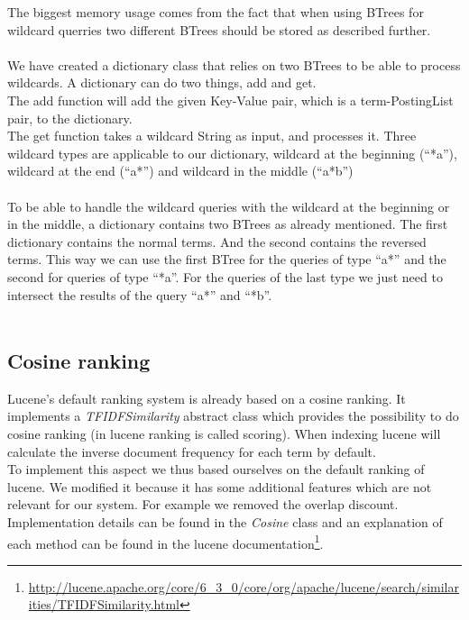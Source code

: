 \documentclass{article}
\begin{document}
The biggest memory usage comes from the fact that when  using BTrees for wildcard querries two different BTrees should be stored as described further.\\\\
We have created a dictionary class that relies on two BTrees to be able to process wildcards. A dictionary can do two things, add and get.\\
The add function will add the given Key-Value pair, which is a term-PostingList pair, to the dictionary.\\
The get function takes a wildcard String as input, and processes it. Three wildcard types are applicable to our dictionary, wildcard at the beginning (``*a''), wildcard at the end (``a*'') and wildcard in the middle (``a*b'')\\\\
To be able to handle the wildcard queries with the wildcard at the beginning or in the middle, a dictionary contains two BTrees as already mentioned. The first dictionary contains the normal terms. And the second contains the reversed terms. This way we can use the first BTree for the queries of type ``a*'' and the second for queries of type ``*a''. For the queries of the last type we just need to intersect the results of the query ``a*'' and ``*b''.\\\\
\subsection{Cosine ranking}
Lucene's default ranking system is already based on a cosine ranking. It implements a \emph{TFIDFSimilarity} abstract class which provides the possibility to do cosine ranking (in lucene ranking is called scoring). When indexing lucene will calculate the inverse document frequency for each term by default.\\
To implement this aspect we thus based ourselves on the default ranking of lucene. We modified it because it has some additional features which are not relevant for our system. For example we removed the overlap discount. Implementation details can be found in the \emph{Cosine} class and an explanation of each method can be found in the lucene documentation\footnote{\url{http://lucene.apache.org/core/6_3_0/core/org/apache/lucene/search/similarities/TFIDFSimilarity.html}}.
\end{document}
